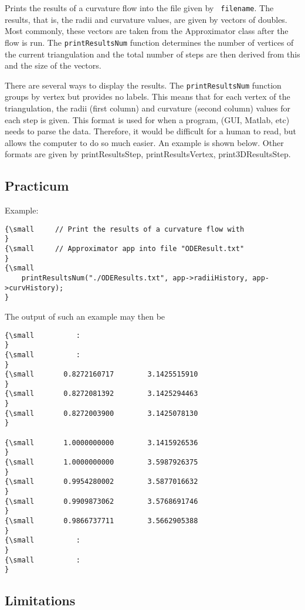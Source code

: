 Prints the results of a curvature flow into the file given by \texttt{%
filename}. The results, that is, the radii and curvature values, are given
by vectors of doubles. Most commonly, these vectors are taken from the
Approximator class after the flow is run. The \texttt{printResultsNum}
function determines the number of vertices of the current triangulation and
the total number of steps are then derived from this and the size of the
vectors.

There are several ways to display the results. The \texttt{printResultsNum}
function groups by vertex but provides no labels. This means that for each
vertex of the triangulation, the radii (first column) and curvature (second
column) values for each step is given. This format is used for when a
program, (GUI, Matlab, etc) needs to parse the data. Therefore, it would be
difficult for a human to read, but allows the computer to do so much easier.
An example is shown below. Other formats are given by printResultsStep,
printResultsVertex, print3DResultsStep.

\subsection*{Practicum}

Example: {\small }
\begin{verbatim}
{\small     // Print the results of a curvature flow with
}
{\small     // Approximator app into file "ODEResult.txt"
}
{\small 
    printResultsNum("./ODEResults.txt", app->radiiHistory, app->curvHistory); 
}
\end{verbatim}

The output of such an example may then be {\small }
\begin{verbatim}
{\small          :
}
{\small          :
}
{\small       0.8272160717        3.1425515910
}
{\small       0.8272081392        3.1425294463
}
{\small       0.8272003900        3.1425078130
}
 
{\small       1.0000000000        3.1415926536
}
{\small       1.0000000000        3.5987926375
}
{\small       0.9954280002        3.5877016632
}
{\small       0.9909873062        3.5768691746
}
{\small       0.9866737711        3.5662905388
}
{\small          :
}
{\small          :
}
\end{verbatim}

\subsection*{Limitations}

